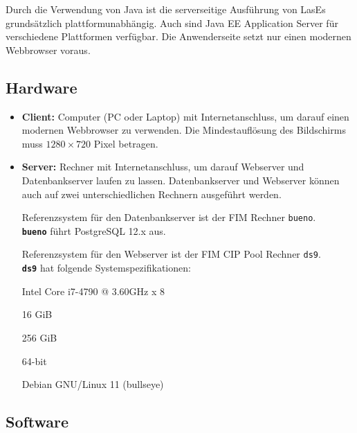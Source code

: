 
Durch die Verwendung von Java ist die serverseitige Ausführung von LasEs
grundsätzlich plattformunabhängig. Auch sind Java EE Application Server für verschiedene Plattformen verfügbar.
Die Anwenderseite setzt nur einen modernen Webbrowser voraus.

\subsection{Hardware}

\begin{itemize}
	\item \textbf{Client:} Computer (PC oder Laptop) mit Internetanschluss, um darauf einen modernen Webbrowser zu verwenden. Die Mindestauflösung des Bildschirms muss $1280 \times 720$ Pixel betragen.

	\item \textbf{Server:} Rechner mit Internetanschluss, um darauf Webserver und Datenbankserver laufen zu lassen. Datenbankserver und Webserver können auch auf zwei unterschiedlichen Rechnern ausgeführt werden.

	\label{dbspezi}
	Referenzsystem für den Datenbankserver ist der FIM Rechner \texttt{bueno}.\\
	\texttt{\textbf{bueno}} führt PostgreSQL 12.x aus.

	\label{spezi}

	Referenzsystem für den Webserver ist der FIM CIP Pool Rechner \texttt{ds9}.\\
	\texttt{\textbf{ds9}} hat folgende Systemspezifikationen:

	\begin{itemize}
		 Intel Core i7-4790 @ 3.60GHz x 8

		 16 GiB

		 256 GiB

		 64-bit

		 Debian GNU/Linux 11 (bullseye)
	\end{itemize}


\end{itemize}

\subsection{Software}

